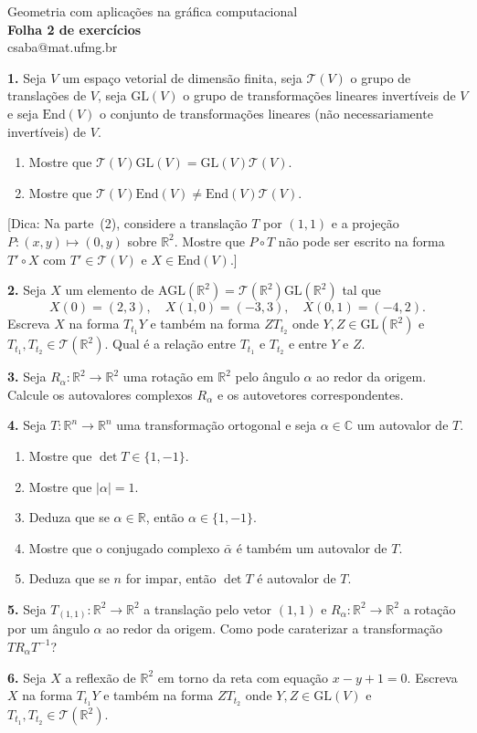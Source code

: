 \documentclass{amsart}
\newcommand{\R}{\mathbb R}
\newcommand{\C}{\mathbb C}
\begin{document}
\begin{center}
\large Geometria com aplicações na gráfica computacional\\
{\bf\large Folha 2 de exercícios}\\
csaba@mat.ufmg.br
\end{center}


\bigskip

{\bf 1.} Seja $V$ um espaço vetorial de dimensão finita, seja $\mathcal T(V)$ o grupo de translações de $V$, seja $\mbox{GL}(V)$ o grupo de transformações lineares invertíveis de $V$ e seja $\mbox{End}(V)$ o conjunto de transformações lineares (não necessariamente invertíveis) de $V$.  
\begin{enumerate}
    \item Mostre que $\mathcal T(V)\mbox{GL}(V)=\mbox{GL}(V)\mathcal T(V)$.
    \item Mostre que $\mathcal T(V)\mbox{End}(V)\neq \mbox{End}(V)\mathcal T(V)$.
\end{enumerate}
[Dica: Na parte~(2), considere a translação $T$ por $(1,1)$ e a projeção $P:(x,y)\mapsto (0,y)$
sobre $\R^2$. Mostre que 
$P\circ T$ não pode ser escrito na forma $T'\circ X$ com $T'\in \mathcal T(V)$ e $X\in\mbox{End}(V)$.]

\medskip

{\bf 2.} Seja $X$ um elemento de $\mbox{AGL}(\R^2)=\mathcal T(\R^2)\mbox{GL}(\R^2)$ tal que 
\[
    X(0)=(2,3),\quad X(1,0)=(-3,3),\quad X(0,1)=(-4,2).
\]
Escreva $X$ na forma $T_{t_1}Y$ e também na forma $ZT_{t_2}$ onde $Y,Z\in\mbox{GL}(\R^2)$ e 
$T_{t_1},T_{t_2}\in\mathcal T(\R^2)$. Qual é a relação entre $T_{t_1}$ e $T_{t_2}$ e entre $Y$ e $Z$.

    \medskip

{\bf 3.} Seja $R_\alpha:\R^2\to\R^2$ uma rotação em $\R^2$ pelo ângulo 
$\alpha$ ao redor da origem. Calcule os autovalores complexos $R_\alpha$
e os autovetores correspondentes.

\medskip


{\bf 4.} Seja $T:\R^n\to\R^n$ uma transformação ortogonal e seja $\alpha\in\C$ um autovalor de $T$. 
\begin{enumerate}
    \item Mostre que $\det T\in\{1,-1\}$.
    \item Mostre que $|\alpha|=1$.
    \item Deduza que se $\alpha\in\R$, então $\alpha\in\{1,-1\}$. 
    \item Mostre que o conjugado complexo $\bar \alpha$ é também um autovalor de $T$.
    \item Deduza que se $n$ for impar, então $\det T$ é autovalor de $T$. 
\end{enumerate}

\medskip

{\bf 5.} Seja $T_{(1,1)}:\R^2\to \R^2$ a translação pelo vetor $(1,1)$ e $R_\alpha:\R^2\to\R^2$ a rotação por um ângulo $\alpha$ ao redor da origem. Como pode caraterizar a transformação $TR_\alpha T^{-1}$?

\medskip


{\bf 6.} Seja $X$ a reflexão de $\R^2$ em torno da reta com equação $x-y+1=0$. Escreva $X$ na forma 
$T_{t_1}Y$ e também na forma $ZT_{t_2}$ onde $Y,Z\in\mbox{GL}(V)$ e $T_{t_1},T_{t_2}\in\mathcal T(\R^2)$. 
\end{document}
